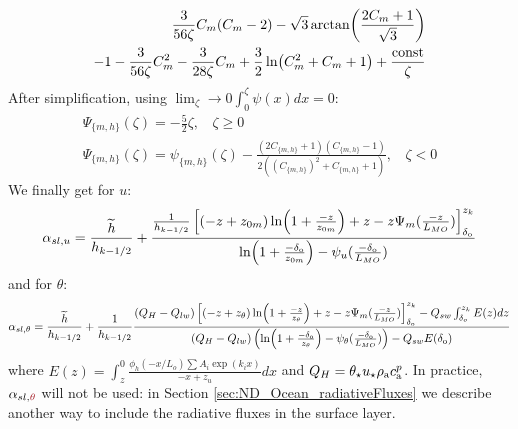 \begin{subappendices}
\begin{equation}
\begin{aligned}
	\frac{3}{56\zeta}C_m(C_m-2)
	- \sqrt{3} \arctan (\frac{2C_m+1}{\sqrt{3}})
	\\
	-1 - \frac{3}{56\zeta}C_m^2 - \frac{3}{28\zeta}C_m
	+\frac{3}{2}\ln (C_m^2+C_m+1)
	+ \frac{{\rm const}}{\zeta}
\end{aligned}
\end{equation}
After simplification, using $\lim_\zeta\to0 \int_0^\zeta\psi(x)dx = 0$:
\begin{equation}
\begin{aligned}
\Psi_{\{m,h\}}(\zeta)= -\frac{5}{2}\zeta, ~~~~ \zeta \geq 0 \\
	\Psi_{\{m,h\}}(\zeta)=
	\psi_{\{m,h\}}(\zeta)
	- \frac{(2C_{\{m,h\}}+1)(C_{\{m,h\}} - 1)}
	{2\left((C_{\{m,h\}})^2 + C_{\{m,h\}} + 1\right)}, ~~~~ \zeta < 0
\end{aligned}
\end{equation}
We finally get for $u$:
\begin{equation}
	\alpha_{sl, u} = \frac{\widetilde{h}}{h_{k-1/2}} +
	\frac{\frac{1}{{h_{k-1/2}}}
    \left[
	    (-z+z_{0m})\ln(1+\frac{-z}{z_{0m}})+z
    -
    z \Psi_m(\frac{-z}{L_{MO}}) \right]_{\delta_{\rm o}}^{z_k}
    }{\ln(1+\frac{-\delta_{\rm o}}{z_{0m}})- \psi_u(\frac{-\delta_{\rm o}}{L_{MO}})
    }
\end{equation}
and for $\theta$:
\begin{equation}
	\alpha_{sl, \theta} =  \frac{\widetilde{h}}{h_{k-1/2}} +
	\frac{1}{{h_{k-1/2}}}\frac{(Q_H -
		Q_{lw})
    \left[
	    (-z+z_{\theta})\ln(1+\frac{-z}{z_{\theta}})+z
    -
    z \Psi_m(\frac{-z}{L_{MO}}) \right]_{\delta_{\rm o}}^{z_k}
	- Q_{sw} \int_{\delta_o}^{z_k}
		E(z) dz
    }{(Q_H - Q_{lw})
	    \left(\ln(1+\frac{-\delta_{\rm o}}{z_{\theta}})-
	    \psi_\theta(\frac{-\delta_{\rm o}}{L_{MO}})\right)
	    -Q_{sw} E(\delta_{\rm o})
    }
\end{equation}
where $E(z) = \int_{z}^0 \frac{\phi_h(-x/L_o)
		\sum A_i \exp (k_i x)
		}{-x + z_{u}}dx$
and $Q_H = \theta_\star u_\star \rho_{\rm a} c_{\rm a}^p$.
In practice, $\alpha_{sl, \emphase{\theta}}$ will not be used: in Section
\ref{sec:ND_Ocean_radiativeFluxes} we describe another way to
include the radiative fluxes in the surface layer.
\end{subappendices}
